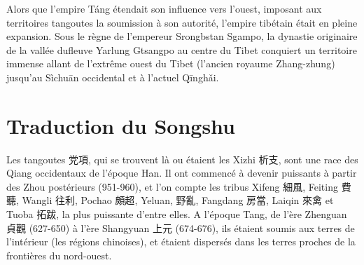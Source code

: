 \documentclass[oldfontcommands,oneside,a4paper,11pt]{memoir}
\newcommand{\zh}[1]{{\cn #1}}
\newcommand{\ah}{\v{a}}
\begin{document}
Alors que l'empire Táng étendait son influence vers l'ouest, imposant aux territoires tangoutes la soumission à son autorité, l'empire tibétain était en pleine expansion. Sous le règne de l'empereur Srongbstan Sgampo, la dynastie originaire de la vallée dufleuve Yarlung Gtsangpo au centre du Tibet conquiert un territoire immense allant de l'extrême ouest du Tibet (l'ancien royaume Zhang-zhung) jusqu'au Sìchuān occidental et à l'actuel Qīngh\ah{}i. 

\section{Traduction du Songshu}
Les tangoutes \zh{党項}, qui se trouvent là ou étaient les Xizhi \zh{析支}, sont une race des Qiang occidentaux de l'époque Han. Il ont commencé à devenir puissants à partir des Zhou postérieurs (951-960), et l'on compte les tribus Xifeng \zh{細風}, Feiting \zh{費聽}, Wangli \zh{往利}, Pochao \zh{頗超},  Yeluan, \zh{野亂}, Fangdang \zh{房當}, Laiqin \zh{來禽} et Tuoba \zh{拓跋}, la plus puissante d'entre elles. A l'époque Tang, de l'ère Zhenguan \zh{貞觀} (627-650) à l'ère Shangyuan \zh{上元} (674-676), ils étaient soumis aux terres de l'intérieur (les régions chinoises), et étaient dispersés dans les terres proches de la frontières du nord-ouest. 
\end{document}
